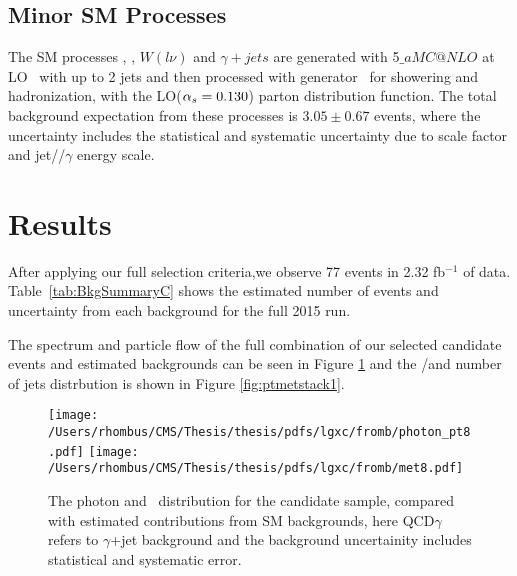  \subsection{Minor SM Processes}
The SM processes \wlng, \zllg, $W(l\nu)$ and $\gamma+jets$
 are generated with \MADGRAPH{}5$\_aMC@NLO$ at LO~\cite{Madgraph_new}
 with up to 2 jets and then
 processed with  generator~\cite{Pythia6} for showering and hadronization,
 with the \NNPDFthree LO($\alpha_s = 0.130$) parton distribution function.
The total background expectation from these processes is $3.05\pm 0.67$ events,
 where the uncertainty includes the statistical and systematic uncertainty due
 to scale factor and jet/\met/$\gamma$ energy scale.


 
\section{Results}

After applying our full selection criteria,we observe 77 events in 2.32 fb$^{-1}$ of data.
Table~\ref{tab:BkgSummaryC}
shows the estimated number of events and uncertainty from each background for the full 2015 run.


The \pt spectrum and particle flow \met of the full combination of our selected candidate events and estimated backgrounds can be seen in Figure \ref{fig:ptmetstack}
and the \pt/\met and number of jets distrbution is shown in Figure \ref{fig:ptmetstack1}.

\begin{figure}[htb]
\caption[Distributions of \pt and \met in the \pploneg analysis]
 {The photon \pt and \met\ distribution for the candidate sample,
  compared with estimated contributions from SM backgrounds, 
  here QCD$\gamma$ refers to $\gamma$+jet background and the
  background uncertainity includes statistical and systematic error. }
\centering
\texttt{[image: /Users/rhombus/CMS/Thesis/thesis/pdfs/lgxc/fromb/photon\_pt8.pdf]}
\texttt{[image: /Users/rhombus/CMS/Thesis/thesis/pdfs/lgxc/fromb/met8.pdf]}
\label{fig:ptmetstack}
\end{figure}



